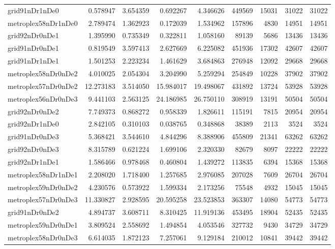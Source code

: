 \begin{longtable}{|l|r|r|r|r|r|r|r|r|}
grid91nDr1nDe0 & 0.578947 & 3.654359 & 0.692267 & 4.346626 & 449569 & 15031 & 31022 & 31022 \\
metroplex58nDr1nDe0 & 2.789474 & 1.362923 & 0.172039 & 1.534962 & 157896 & 4830 & 14951 & 14951 \\
grid92nDr0nDe1 & 1.395990 & 0.735349 & 0.322811 & 1.058160 & 89139 & 5686 & 13436 & 13436 \\
grid91nDr0nDe1 & 0.819549 & 3.597413 & 2.627669 & 6.225082 & 451936 & 17302 & 42607 & 42607 \\
grid91nDr1nDe1 & 1.501253 & 2.223234 & 1.461629 & 3.684863 & 276948 & 12092 & 29668 & 29668 \\
metroplex58nDr0nDe2 & 4.010025 & 2.054304 & 3.204990 & 5.259294 & 254849 & 10228 & 37902 & 37902 \\
metroplex57nDr0nDe2 & 12.273183 & 3.514050 & 15.984017 & 19.498067 & 431892 & 13724 & 53928 & 53928 \\
metroplex56nDr0nDe3 & 9.441103 & 2.563125 & 24.186985 & 26.750110 & 308919 & 13191 & 50504 & 50504 \\
grid92nDr0nDe2 & 7.749373 & 0.868272 & 0.958339 & 1.826611 & 115191 & 7815 & 20954 & 20954 \\
grid92nDr1nDe0 & 2.842105 & 0.310103 & 0.038765 & 0.348868 & 38389 & 2113 & 3524 & 3524 \\
grid91nDr0nDe3 & 5.368421 & 3.544610 & 4.844296 & 8.388906 & 455809 & 21341 & 63262 & 63262 \\
grid92nDr0nDe3 & 8.315789 & 0.621224 & 1.699106 & 2.320330 & 82679 & 8097 & 22222 & 22222 \\
grid92nDr1nDe1 & 1.586466 & 0.978468 & 0.460804 & 1.439272 & 113835 & 6394 & 15368 & 15368 \\
metroplex58nDr1nDe1 & 2.208020 & 1.718400 & 1.257685 & 2.976085 & 207028 & 7609 & 26704 & 26704 \\
metroplex59nDr0nDe2 & 4.230576 & 0.573922 & 1.599334 & 2.173256 & 75548 & 4932 & 15045 & 15045 \\
metroplex57nDr0nDe3 & 11.330827 & 2.928595 & 20.595258 & 23.523853 & 363307 & 14080 & 54773 & 54773 \\
grid91nDr0nDe2 & 4.894737 & 3.608711 & 8.310425 & 11.919136 & 453495 & 18904 & 52435 & 52435 \\
metroplex59nDr0nDe1 & 3.809524 & 2.558692 & 1.494854 & 4.053546 & 327732 & 9430 & 34729 & 34729 \\
metroplex58nDr0nDe3 & 6.614035 & 1.872123 & 7.257061 & 9.129184 & 210012 & 10841 & 39442 & 39442 \\

\end{longtable}
